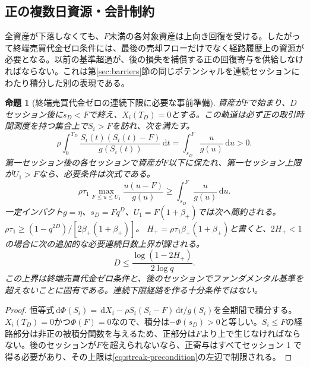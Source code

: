 \documentclass[11pt]{article}
\numberwithin{equation}{section}
\newtheorem{proposition}[theorem]{命題}
\theoremstyle{definition}
\theoremstyle{remark}
\newcommand{\dd}{\,\mathrm{d}}
\begin{document}
\subsection{正の複数日資源・会計制約}\label{subsec:multiday-preconditioning}
全資産が下落しなくても、$F$未満の各対象資産は上向き回復を受ける。したがって終端売買代金ゼロ条件には、最後の売却フローだけでなく経路履歴上の資源が必要となる。以前の基準超過が、後の損失を補償する正の回復寄与を供給しなければならない。これは第\ref{sec:barriers}節の同じポテンシャルを連続セッションにわたり積分した別の表現である。
\begin{proposition}[終端売買代金ゼロの連続下限に必要な事前準備]\label{prop:streak-precondition}
資産が$F$で始まり、$D$セッション後に$s_D<F$で終え、$X_i(T_D)=0$とする。この軌道は必ず正の取引時間測度を持つ集合上で$S_i>F$を訪れ、次を満たす。
\begin{equation}\label{eq:streak-excursion}
 \rho\int_0^{T_D}\frac{S_i(t)(S_i(t)-F)}{g(S_i(t))}\dd t
 =\int_{s_D}^{F}\frac{u}{g(u)}\dd u>0.
\end{equation}
第一セッション後の各セッションで資産が$F$以下に保たれ、第一セッション上限が$U_1>F$なら、必要条件は次式である。
\begin{equation}\label{eq:streak-precondition}
 \boxed{\quad \rho\tau_1\max_{F\le u\le U_1}\frac{u(u-F)}{g(u)}
 \ge \int_{s_D}^{F}\frac{u}{g(u)}\dd u.\quad}
\end{equation}
一定インパクト$g=\eta$、$s_D=Fq^D$、$U_1=F(1+\beta_+)$では次へ簡約される。
$\rho\tau_1\ge(1-q^{2D})/[2\beta_+(1+\beta_+)]$。
$H_+=\rho\tau_1\beta_+(1+\beta_+)$と書くと、$2H_+<1$の場合に次の追加的な必要連続日数上界が課される。
\begin{equation}\label{eq:multiday-preconditioning-D}
\boxed{\quad D\le \frac{\log(1-2H_+)}{2\log q}.\quad}
\end{equation}
この上界は終端売買代金ゼロ条件と、後のセッションでファンダメンタル基準を超えないことに固有である。連続下限経路を作る十分条件ではない。
\end{proposition}
\begin{proof}
恒等式$\dd\Phi(S_i)=\dd X_i-\rho S_i(S_i-F)\dd t/g(S_i)$を全期間で積分する。$X_i(T_D)=0$かつ$\Phi(F)=0$なので、積分は$-\Phi(s_D)>0$と等しい。$S_i\le F$の経路部分は非正の被積分関数を与えるため、正部分は$F$より上で生じなければならない。後のセッションが$F$を超えられないなら、正寄与はすべてセッション 1 で得る必要があり、その上限は\eqref{eq:streak-precondition}の左辺で制限される。
\end{proof}
\end{document}
